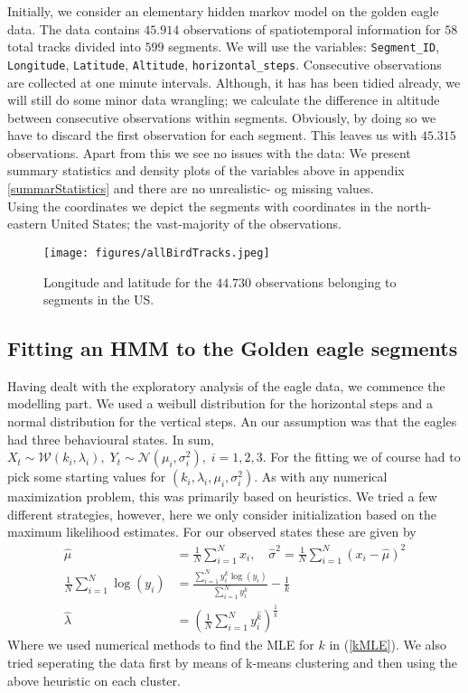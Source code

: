 Initially, we consider an elementary hidden markov model on the golden eagle data.\cite{eagleData} The data contains $45.914$ observations of spatiotemporal information for $58$ total tracks divided into $599$ segments. We will use the variables: \texttt{Segment\_ID}, \texttt{Longitude}, \texttt{Latitude}, \texttt{Altitude}, \texttt{horizontal\_steps}. Consecutive observations are collected at one minute intervals. Although, it has has been tidied already, we will still do some minor data wrangling; we calculate the difference in altitude between consecutive observations within segments. Obviously, by doing so we have to discard the first observation for each segment. This leaves us with $45.315$ observations. Apart from this we see no issues with the data: We present summary statistics and density plots of the variables above in appendix \ref{summarStatistics} and there are no unrealistic- og missing values.\\ Using the coordinates we depict the segments with coordinates in the north-eastern United States; the vast-majority of the observations.
\begin{figure}[h]
    \begin{center}
        \texttt{[image: figures/allBirdTracks.jpeg]}
        \caption{Longitude and latitude for the $44.730$ observations belonging to segments in the US.}
    \end{center}
\end{figure}
\subsection{Fitting an HMM to the Golden eagle segments}\label{hmmGoldenEagle}
Having dealt with the exploratory analysis of the eagle data, we commence the modelling part. We used a weibull distribution for the horizontal steps and a normal distribution for the vertical steps. An our assumption was that the eagles had three behavioural states. In sum, $X_t \sim \mathcal{W}(k_i, \lambda_i), \; Y_t \sim \mathcal{N}(\mu_i, \sigma_i^2), \; i = 1,2,3$. For the fitting we of course  had to pick some starting values for $(k_i, \lambda_i, \mu_i, \sigma_i^2)$. As with any numerical maximization problem, this was primarily based on heuristics. We tried a few different strategies, however, here we only consider initialization based on the maximum likelihood estimates. For our observed states these are given by\cite{Cohen1965}
\begin{align}
    \hat{\mu} &= \frac{1}{N}\sum_{i = 1}^N x_i, \quad \hat{\sigma}^2 = \frac{1}{N}\sum_{i = 1}^N \left(x_i-\hat{\mu}\right)^2\\
    \frac{1}{N}\sum_{i = 1}^N \log(y_i)&= \frac{\sum_{i = 1}^N y_i^k\log(y_i)}{\sum_{i = 1}^N y_i^k} - \frac{1}{k} \label{kMLE} \\  \hat{\lambda} &= \left(\frac{1}{N} \sum_{i = 1}^N y_i^{\hat{k}}\right)^{\frac{1}{\hat{k}}}
\end{align}
Where we used numerical methods to find the MLE for $k$ in (\ref{kMLE}). We also tried seperating the data first by means of k-means clustering \cite{RLang} and then using the above heuristic on each cluster.
